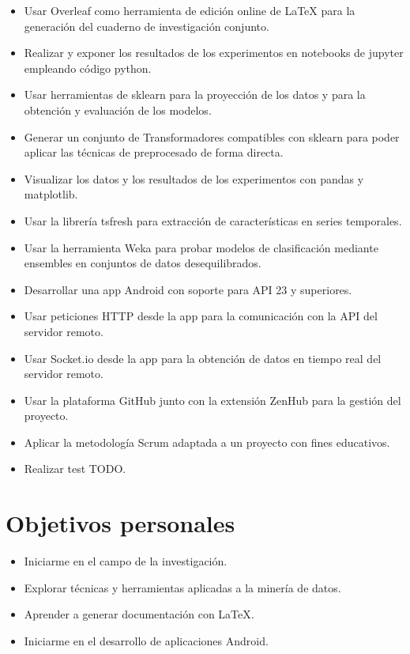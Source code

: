 \begin{itemize}
	\item Usar Overleaf como herramienta de edición online de LaTeX para la generación del cuaderno de investigación conjunto.  
	\item Realizar y exponer los resultados de los experimentos en notebooks de jupyter empleando código python. 
	\item Usar herramientas de sklearn para la proyección de los datos y para la obtención y evaluación de los modelos.
	\item Generar un conjunto de Transformadores compatibles con sklearn para poder aplicar las técnicas de preprocesado de forma directa. 
	\item Visualizar los datos y los resultados de los experimentos con pandas y matplotlib. 
	\item Usar la librería tsfresh para extracción de características en series temporales. 
	\item Usar la herramienta Weka para probar modelos de clasificación mediante ensembles en conjuntos de datos desequilibrados. 
	\item Desarrollar una app Android con soporte para API 23 y superiores. 
	\item Usar peticiones HTTP desde la app para la comunicación con la API del servidor remoto. 
	\item Usar Socket.io desde la app para la obtención de datos en tiempo real del servidor remoto.
	\item Usar la plataforma GitHub junto con la extensión ZenHub para la gestión del proyecto. 
	\item Aplicar la metodología Scrum adaptada a un proyecto con fines educativos. 
	\item Realizar test TODO. 
	
	
\end{itemize}

\section{Objetivos personales}

\begin{itemize}
	\item Iniciarme en el campo de la investigación. 
	\item Explorar técnicas y herramientas aplicadas a la minería de datos. 
	\item Aprender a generar documentación con LaTeX. 
	\item Iniciarme en el desarrollo de aplicaciones Android. 
\end{itemize}
